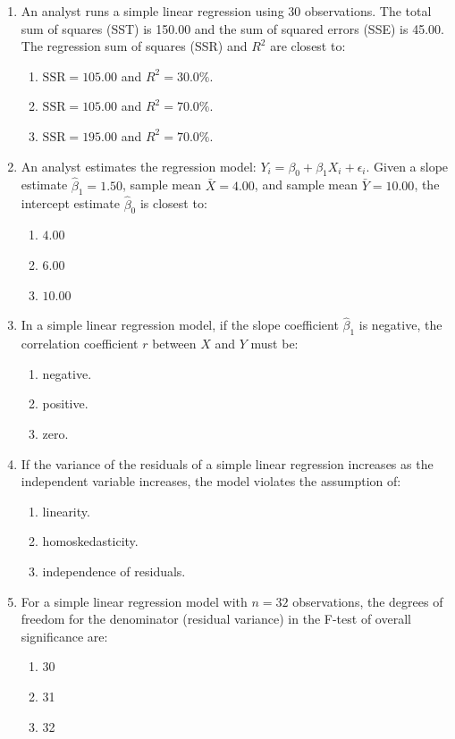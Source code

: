 \begin{enumerate}
	\item An analyst runs a simple linear regression using 30 observations. The total sum of squares (SST) is 150.00 and the sum of squared errors (SSE) is 45.00. The regression sum of squares (SSR) and $R^2$ are closest to:
	      \begin{enumerate}[label=\Alph*.]
		      \item $\text{SSR} = 105.00$ and $R^2 = 30.0\%$.
		      \item $\text{SSR} = 105.00$ and $R^2 = 70.0\%$.
		      \item $\text{SSR} = 195.00$ and $R^2 = 70.0\%$.
	      \end{enumerate}

	\item An analyst estimates the regression model: $Y_i = \beta_0 + \beta_1 X_i + \epsilon_i$. Given a slope estimate $\hat{\beta}_1 = 1.50$, sample mean $\bar{X} = 4.00$, and sample mean $\bar{Y} = 10.00$, the intercept estimate $\hat{\beta}_0$ is closest to:
	      \begin{enumerate}[label=\Alph*.]
		      \item $4.00$
		      \item $6.00$
		      \item $10.00$
	      \end{enumerate}

	\item In a simple linear regression model, if the slope coefficient $\hat{\beta}_1$ is negative, the correlation coefficient $r$ between $X$ and $Y$ must be:
	      \begin{enumerate}[label=\Alph*.]
		      \item negative.
		      \item positive.
		      \item zero.
	      \end{enumerate}

	\item If the variance of the residuals of a simple linear regression increases as the independent variable increases, the model violates the assumption of:
	      \begin{enumerate}[label=\Alph*.]
		      \item linearity.
		      \item homoskedasticity.
		      \item independence of residuals.
	      \end{enumerate}

	\item For a simple linear regression model with $n=32$ observations, the degrees of freedom for the denominator (residual variance) in the F-test of overall significance are:
	      \begin{enumerate}[label=\Alph*.]
		      \item 30
		      \item 31
		      \item 32
	      \end{enumerate}


\end{enumerate}
